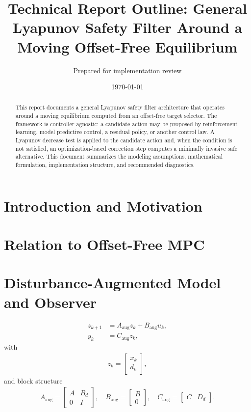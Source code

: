 \documentclass[11pt]{article}
\title{Technical Report Outline: General Lyapunov Safety Filter Around a Moving Offset-Free Equilibrium}
\author{Prepared for implementation review}
\date{\today}
\begin{document}
\maketitle

\begin{abstract}
This report documents a general Lyapunov safety filter architecture that operates around a moving equilibrium computed from an offset-free target selector. The framework is controller-agnostic: a candidate action may be proposed by reinforcement learning, model predictive control, a residual policy, or another control law. A Lyapunov decrease test is applied to the candidate action and, when the condition is not satisfied, an optimization-based correction step computes a minimally invasive safe alternative. This document summarizes the modeling assumptions, mathematical formulation, implementation structure, and recommended diagnostics.
\end{abstract}

\section{Introduction and Motivation}

\section{Relation to Offset-Free MPC}

\section{Disturbance-Augmented Model and Observer}
\begin{align}
z_{k+1} &= A_{\mathrm{aug}} z_k + B_{\mathrm{aug}} u_k, \\
y_k &= C_{\mathrm{aug}} z_k,
\end{align}
with
\begin{align}
z_k = \begin{bmatrix} x_k \\ d_k \end{bmatrix},
\end{align}
and block structure
\begin{align}
A_{\mathrm{aug}} = \begin{bmatrix} A & B_d \\ 0 & I \end{bmatrix}, \quad
B_{\mathrm{aug}} = \begin{bmatrix} B \\ 0 \end{bmatrix}, \quad
C_{\mathrm{aug}} = \begin{bmatrix} C & D_d \end{bmatrix}.
\end{align}
\end{document}
